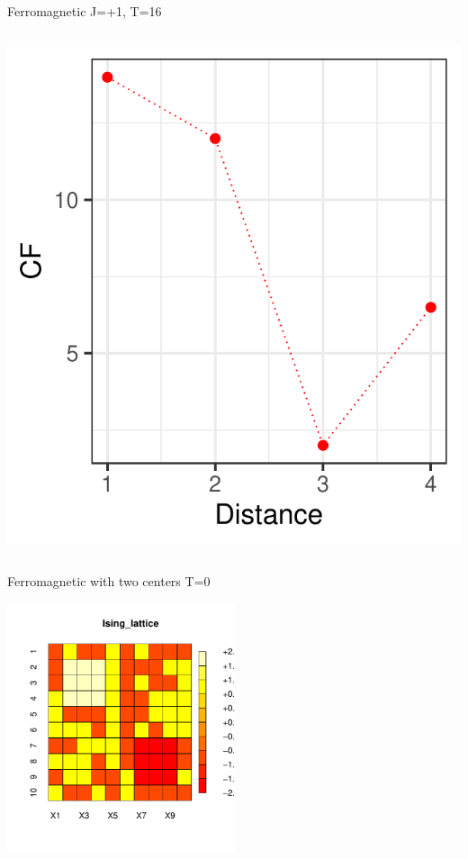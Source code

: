 \documentclass{beamer}
\begin{document}
\begin{frame}{Ferromagnetic J=+1, T=16}
\begin{columns}
\begin{column}{0.5\textwidth}
\begin{center}
     \includegraphics[width=\textwidth]{Pic/J+1_10_2500_T=16_Coherence.pdf}
     \end{center}
\end{column}
\end{columns}
\end{frame}



\begin{frame}{Ferromagnetic with two centers T=0}
    \begin{center}
     \includegraphics[width=0.5\textwidth]{Pic/2CENTER.pdf}
     \end{center}
\end{frame}
\end{document}
